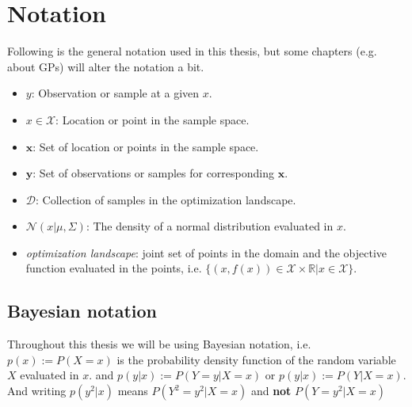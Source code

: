 

\section{Notation}
Following is the general notation used in this thesis, but some chapters (e.g. about GPs) will alter the notation a bit. 
\begin{itemize}[noitemsep]
    \item $y$: Observation or sample at a given $x$.
    \item $x \in \mathcal{X}$: Location or point in the sample space.
    \item $\textbf{x}$: Set of location or points in the sample space.
    \item $\textbf{y}$: Set of observations or samples for corresponding $\textbf{x}$.
    \item $\mathcal{D}$: Collection of samples in the optimization landscape. 
    \item $\mathcal{N}(x|\mu, \Sigma)$: The density of a normal distribution evaluated in $x$.
    \item \textit{optimization landscape}: joint set of points in the domain and the objective function
    evaluated in the points, i.e. $\{(x,f(x))\in \mathcal{X} \times \mathbb{R}| x \in \mathcal{X}\}$.
\end{itemize}

\subsection{Bayesian notation}
Throughout this thesis we will be using Bayesian notation, i.e. $p(x) := P(X=x)$ is the probability
density function of the random variable $X$ evaluated in $x$. and $p(y|x) := P(Y=y|X=x)$ or $p(y|x)
:= P(Y|X=x)$. And writing $p(y^2|x)$ means $P(Y^2=y^2|X=x)$ and \textbf{not} $P(Y=y^2|X=x)$





